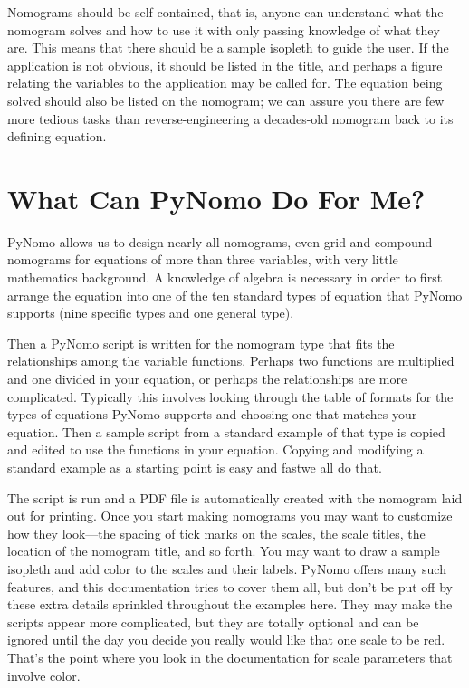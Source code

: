 \documentclass[a4paper,11pt,english]{sphinxmanual}
\begin{document}
Nomograms should be self-contained, that is, anyone can understand what the nomogram solves and how to use it with only passing knowledge of what they are. This means that there should be a sample isopleth to guide the user. If the application is not obvious, it should be listed in the title, and perhaps a figure relating the variables to the application may be called for. The equation being solved should also be listed on the nomogram; we can assure you there are few more tedious tasks than reverse-engineering a decades-old nomogram back to its defining equation.


\section{What Can PyNomo Do For Me?}
\label{\detokenize{introduction/introduction:what-can-pynomo-do-for-me}}
PyNomo allows us to design nearly all nomograms, even grid and compound nomograms for equations of more than three variables, with very little mathematics background. A knowledge of algebra is necessary in order to first arrange the equation into one of the ten standard types of equation that PyNomo supports (nine specific types and one general type).

Then a PyNomo script is written for the nomogram type that fits the relationships among the variable functions. Perhaps two functions are multiplied and one divided in your equation, or perhaps the relationships are more complicated. Typically this involves looking through the table of formats for the types of equations PyNomo supports and choosing one that matches your equation. Then a sample script from a standard example of that type is copied and edited to use the functions in your equation. Copying and modifying a standard example as a starting point is easy and fast\textendash{}we all do that.

The script is run and a PDF file is automatically created with the nomogram laid out for printing. Once you start making nomograms you may want to customize how they look—the spacing of tick marks on the scales, the scale titles, the location of the nomogram title, and so forth. You may want to draw a sample isopleth and add color to the scales and their labels. PyNomo offers many such features, and this documentation tries to cover them all, but don’t be put off by these extra details sprinkled throughout the examples here. They may make the scripts appear more complicated, but they are totally optional and can be ignored until the day you decide you really would like that one scale to be red. That’s the point where you look in the documentation for scale parameters that involve color.
\end{document}
